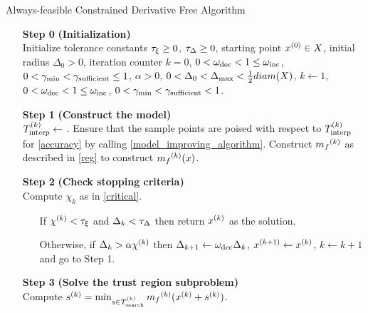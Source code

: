 \begin{algorithm}[H]
    \caption{Always-feasible Constrained Derivative Free Algorithm}
    \label{constrained_dfo}
    \begin{itemize}
        \item[\textbf{Step 0}] \textbf{(Initialization)} \\
            Initialize tolerance constants 
            $\tau_{\xi} \ge 0$,
            $\tau_{\Delta} \ge 0$,
            starting point $x^{(0)} \in X$,
            initial radius $\Delta_0 > 0$,
            iteration counter $k=0$,
            $0 < \omega_{\text{dec}} < 1 \le \omega_{\text{inc}}$,
            $0 < \gamma_{\text{min}} < \gamma_{\text{sufficient}} \le 1$,
            $\alpha > 0$,
            $0 < \Delta_0 < \Delta_{\text{max}} < \frac 1 2 diam(X)$,
            $k \gets 1$,
            $0 < \omega_{\text{dec}} < 1 \le \omega_{\text{inc}}$,
            $0 < \gamma_{\text{min}} < \gamma_{\text{sufficient}} < 1$.
            
        \item[\textbf{Step 1}] \textbf{(Construct the model)} \\
            $ {T_{\text{interp}}^{(k)}} \gets $ .
            Ensure that the sample points are poised with respect to $ {T_{\text{interp}}^{(k)}} $ for \cref{accuracy} by calling \cref{model_improving_algorithm}.
            Construct ${{m}_f}^{(k)}$ as described in \cref{reg} to construct ${{m}_f}^{(k)}(x)$.
        
        \item[\textbf{Step 2}] \textbf{(Check stopping criteria)} \\
            Compute $\chi_k$ as in \cref{critical}. \begin{itemize}
                \item[] If $ {\chi^{(k)}} < \tau_{\xi} $ and $\Delta_k <\tau_{\Delta}$ then return ${x^{(k)}}$ as the solution.
                \item[] Otherwise, if $\Delta_k > \alpha {\chi^{(k)}}$ then 
                $\Delta_{k+1} \gets \omega_{\text{dec}}\Delta_k$, 
                $x^{(k+1)} \gets {x^{(k)}}$,
                $k \gets k+1$ and go to Step 1.
            \end{itemize}
        
        \item[\textbf{Step 3}] \textbf{(Solve the trust region subproblem)} \\
            Compute ${{s}^{(k)}} = \min_{s \in {T_{\text{search}}^{(k)}}} {{m}_f}^{(k)}({x^{(k)}} + {{s}^{(k)}})$.
            

\end{itemize}
\end{algorithm}
